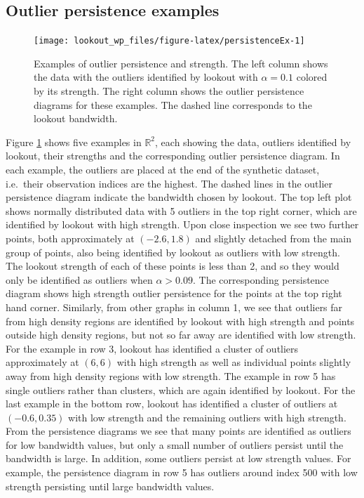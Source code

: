 \documentclass[11pt,a4paper,]{article}
\theoremstyle{definition}
\theoremstyle{definition}
\theoremstyle{definition}
\theoremstyle{remark}
\begin{document}
\hypertarget{sec:PersistenceExamples}{%
\subsection{Outlier persistence examples}\label{sec:PersistenceExamples}}

\begin{figure}
\texttt{[image: lookout\_wp\_files/figure-latex/persistenceEx-1]} \caption{Examples of outlier persistence and strength. The left column shows the data with the outliers identified by lookout with $\alpha = 0.1$ colored by its strength. The right column shows the outlier persistence diagrams for these examples. The dashed line corresponds to the lookout bandwidth.}\label{fig:persistenceEx}
\end{figure}

Figure \ref{fig:persistenceEx} shows five examples in \(\mathbb{R}^2\), each showing the data, outliers identified by lookout, their strengths and the corresponding outlier persistence diagram. In each example, the outliers are placed at the end of the synthetic dataset, i.e.~their observation indices are the highest. The dashed lines in the outlier persistence diagram indicate the bandwidth chosen by lookout. The top left plot shows normally distributed data with 5 outliers in the top right corner, which are identified by lookout with high strength. Upon close inspection we see two further points, both approximately at \((-2.6, 1.8)\) and slightly detached from the main group of points, also being identified by lookout as outliers with low strength. The lookout strength of each of these points is less than 2, and so they would only be identified as outliers when \(\alpha > 0.09\). The corresponding persistence diagram shows high strength outlier persistence for the points at the top right hand corner. Similarly, from other graphs in column 1, we see that outliers far from high density regions are identified by lookout with high strength and points outside high density regions, but not so far away are identified with low strength. For the example in row 3, lookout has identified a cluster of outliers approximately at \((6,6)\) with high strength as well as individual points slightly away from high density regions with low strength. The example in row 5 has single outliers rather than clusters, which are again identified by lookout. For the last example in the bottom row, lookout has identified a cluster of outliers at \((-0.6, 0.35)\) with low strength and the remaining outliers with high strength. From the persistence diagrams we see that many points are identified as outliers for low bandwidth values, but only a small number of outliers persist until the bandwidth is large. In addition, some outliers persist at low strength values. For example, the persistence diagram in row 5 has outliers around index 500 with low strength persisting until large bandwidth values.
\end{document}
